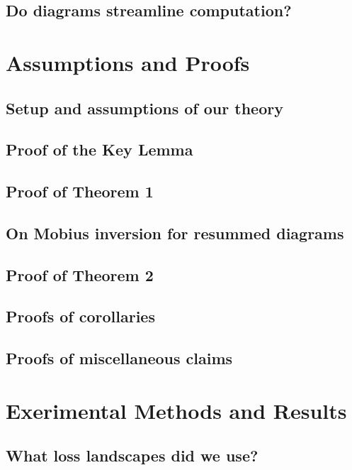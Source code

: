 \documentclass{article}
\theoremstyle{plain}
\theoremstyle{definition}
\begin{document}
    \subsection{Do diagrams streamline computation?}                %

\section{Assumptions and Proofs}
    \subsection{Setup and assumptions of our theory}                %
    \subsection{Proof of the Key Lemma}                             %
    \subsection{Proof of Theorem 1}                                 %
    \subsection{On Mobius inversion for resummed diagrams}          %
    \subsection{Proof of Theorem 2}                                 %
    \subsection{Proofs of corollaries}                              %
    \subsection{Proofs of miscellaneous claims}                     %

\section{Exerimental Methods and Results}
    \subsection{What loss landscapes did we use?}                   %
\end{document}
